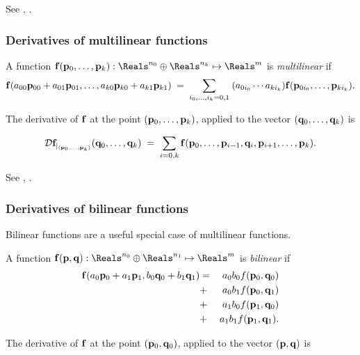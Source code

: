 See \cite[Theorem~2-2]{spivak-1965}, .


\subsubsection{Derivatives of multilinear functions}
\label{sec:multilinear}

A function $\f(\p_0,\ldots,\p_k):\Reals^{n_0} \oplus \Reals^{n_k} \mapsto \Reals^m$
is {\it multilinear} if
\begin{equation}
{\mathbf f}(a_{00} {\mathbf p}_{00} + a_{01} {\mathbf p}_{01}, \ldots, a_{k0} {\mathbf p}_{k0} + a_{k1} {\mathbf p}_{k1})
\; = \; \sum_{i_0,\ldots,i_k = 0,1} \;(a_{0i_0} \cdots a_{ki_k}) {\mathbf f}({\mathbf p}_{0i_0}, \ldots, {\mathbf p}_{ki_k}).
\end{equation}

The derivative of ${\mathbf f}$
at the point $({\mathbf p}_0,\ldots,{\mathbf p}_k)$, applied to the vector $({\mathbf q}_0,\ldots,{\mathbf q}_k)$ is

\begin{equation}
{\mathcal{D}{{\mathbf f}}_{\mid_{({\mathbf p}_0,\ldots,{\mathbf p}_k)}}({{\mathbf q}_0,\ldots,{\mathbf q}_k})}
\; = \; \sum_{i=0,k} {\mathbf f}({\mathbf p}_0,\ldots,{\mathbf p}_{i-1},{\mathbf q}_i,{\mathbf p}_{i+1},\ldots,{\mathbf p}_k).
\end{equation}

See \cite[ex.~2-14]{spivak-1965}, .



\subsubsection{Derivatives of bilinear functions}
\label{sec:bilinear}

Bilinear functions are a useful special case of multilinear functions.

A function $\f(\p,\q):\Reals^{n_0} \oplus \Reals^{n_1} \mapsto \Reals^m$
is {\it bilinear} if
\begin{eqnarray}
{\mathbf f}(a_0 {\mathbf p}_0 + a_1 {\mathbf p}_1, b_0 {\mathbf q}_0 + b_1 {\mathbf q}_1) & = & a_0 b_0 f({\mathbf p}_0,{\mathbf q}_0)  \\
                                             & + & a_0 b_1 f({\mathbf p}_0,{\mathbf q}_1) \nonumber \\
                                             & + & a_1 b_0 f({\mathbf p}_1,{\mathbf q}_0) \nonumber \\
                                             & + & a_1 b_1 f({\mathbf p}_1,{\mathbf q}_1).\nonumber
\end{eqnarray}

The derivative of ${\mathbf f}$
at the point $({\mathbf p}_0,{\mathbf q}_0)$, applied to the vector $({\mathbf p},{\mathbf q})$ is

